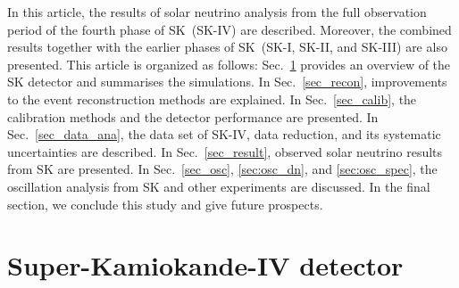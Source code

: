 \documentclass[aps,prd,reprint,superscriptaddress,floatfix,altaffilletter,nofootinbib]{revtex4-2}
\begin{document}
In this article, the results of solar neutrino analysis from the full observation period of the fourth phase of SK~(SK-IV) are described. Moreover, the combined results together with the earlier phases of SK~(SK-I, SK-II, and SK-III) are also presented. 
This article is organized as follows: Sec.~\ref{sec_det} provides an overview of the SK detector and summarises the simulations. In Sec.~\ref{sec_recon}, improvements to the event reconstruction methods are explained. In Sec.~\ref{sec_calib}, the calibration methods and the detector performance are presented. In Sec.~\ref{sec_data_ana}, the data set of SK-IV, data reduction, and its systematic uncertainties are described. In Sec.~\ref{sec_result}, 
observed solar neutrino results from SK are presented. 
In Sec.~\ref{sec_osc}, \ref{sec:osc_dn}, and \ref{sec:osc_spec}, the oscillation analysis from SK and other experiments are discussed. In the final section, we conclude this study and give future prospects.



\section{Super-Kamiokande-IV detector} \label{sec_det}
\end{document}
